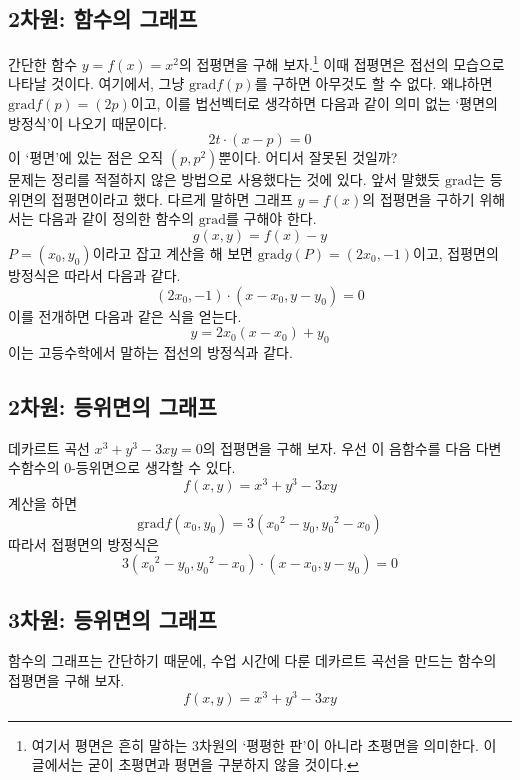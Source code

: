 \documentclass{scrartcl}
\newcommand{\grad}{\text{grad}}
\begin{document}
\subsection{2차원: 함수의 그래프}
간단한 함수 \(y=f(x)=x^2\)의 접평면을 구해 보자.\footnote{여기서 평면은 흔히 말하는 3차원의 `평평한 판'이 아니라 초평면을 의미한다. 이 글에서는 굳이 초평면과 평면을 구분하지 않을 것이다.} 이때 접평면은 접선의 모습으로 나타날 것이다. 여기에서, 그냥 \(\grad f(p)\)를 구하면 아무것도 할 수 없다. 왜냐하면 \(\grad f(p)=(2p)\)이고, 이를 법선벡터로 생각하면 다음과 같이 의미 없는 `평면의 방정식'이 나오기 때문이다.
\[2t\cdot(x-p)=0\]
이 `평면'에 있는 점은 오직 \((p,p^2)\)뿐이다. 어디서 잘못된 것일까?\\[1\baselineskip]
문제는 정리를 적절하지 않은 방법으로 사용했다는 것에 있다. 앞서 말했듯 \(\grad\)는 등위면의 접평면이라고 했다. 다르게 말하면 그래프 \(y=f(x)\)의 접평면을 구하기 위해서는 다음과 같이 정의한 함수의 \(\grad\)를 구해야 한다.
\[g(x,y)=f(x)-y\]
\(P=(x_0,y_0)\)이라고 잡고 계산을 해 보면 \(\grad g(P)=(2x_0,-1)\)이고, 접평면의 방정식은 따라서 다음과 같다.
\[(2x_0,-1)\cdot(x-x_0,y-y_0)=0\]
이를 전개하면 다음과 같은 식을 얻는다.
\[y=2x_0(x-x_0)+y_0\]
이는 고등수학에서 말하는 접선의 방정식과 같다.

\subsection{2차원: 등위면의 그래프}
데카르트 곡선 \(x^3+y^3-3xy=0\)의 접평면을 구해 보자. 우선 이 음함수를 다음 다변수함수의 0-등위면으로 생각할 수 있다.
\[f(x,y)=x^3+y^3-3xy\]
계산을 하면
\[\grad f(x_0,y_0)=3({x_0}^2-y_0,{y_0}^2-x_0)\]
따라서 접평면의 방정식은
\[3({x_0}^2-y_0,{y_0}^2-x_0)\cdot(x-x_0,y-y_0)=0\]

\subsection{3차원: 등위면의 그래프}
함수의 그래프는 간단하기 때문에, 수업 시간에 다룬 데카르트 곡선을 만드는 함수의 접평면을 구해 보자.
\[f(x,y)=x^3+y^3-3xy\]
\begin{center}
  
\end{center}
\end{document}
